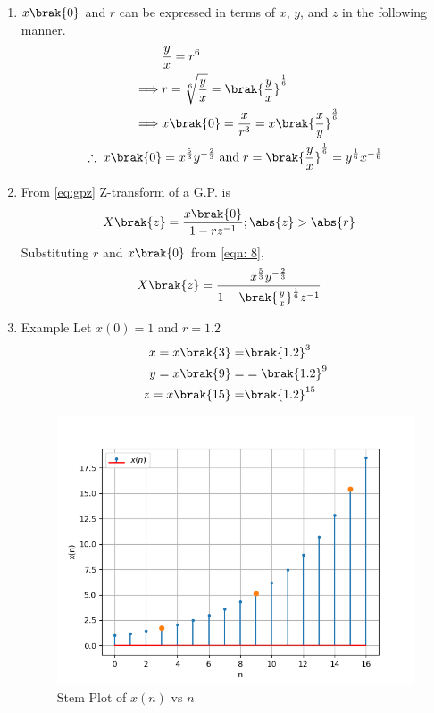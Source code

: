 \documentclass[journal,12pt,twocolumn]{IEEEtran}
\theoremstyle{remark}
\begin{document}
\begin{enumerate}
\item
$x\brak{0}$ and $r$ can be expressed in terms of $x$, $y$, and $z$ in the following manner.
\begin{align}
    &\frac{y}{x}=r^6 \\
	\implies& r=\sqrt[6]{\frac{y}{x}}=\brak{\frac{y}{x}}^{\frac{1}{6}}\\
    \implies& x\brak{0}=\frac{x}{r^3} =x\brak{\frac{x}{y}}^{\frac{3}{6}}\\
	\therefore\; x\brak{0}&=x^{\frac{5}{3}}y^{-\frac{2}{3}}\;
	\text{and}\; r=\brak{\frac{y}{x}}^{\frac{1}{6}}= y^{\frac{1}{6}}x^{-\frac{1}{6}} \label{eqn: 8}
\end{align}
\item 
From \eqref{eq:gpz} Z-transform of a G.P. is
\begin{align}
    X\brak{z}&=\frac{x\brak{0}}{1-rz^{-1}}; \abs{z}>\abs{r}
\end{align}
Substituting $r$ and $x\brak{0}$ from \eqref{eqn: 8}, 
\begin{align}
     X\brak{z}&=\frac{x^{\frac{5}{3}}y^{-\frac{2}{3}}}{1-{\brak{\frac{y}{x}}^{\frac{1}{6}}}z^{-1}}
\end{align}
\item Example 
Let $x(0)=1$ and $r=1.2$
\begin{align}
    x=x\brak{3}=& \brak{1.2}^3 \\
    y=x\brak{9}=&=\brak{1.2}^9\\
    z=x\brak{15}=&\brak{1.2}^{15}
\end{align}
\begin{figure}[h]
    \centering
    \includegraphics[width=\columnwidth]{ncert-maths/11/9/3/17/figs/A_1.png}
	\caption{Stem Plot of $x(n)$ vs $n$}
        \label{fig:1}
\end{figure}


\end{enumerate}
\end{document}
